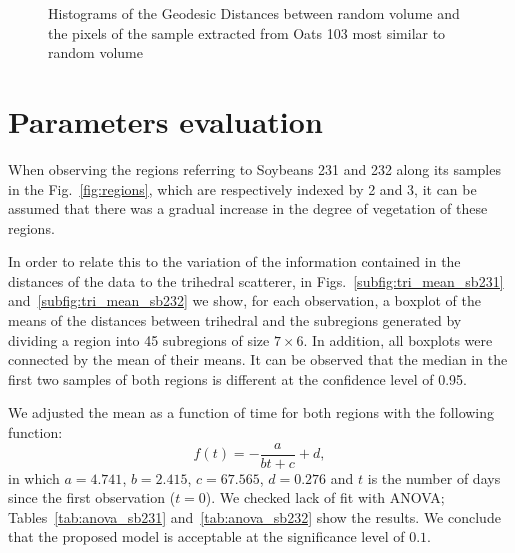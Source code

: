 \documentclass[12pt]{article}
\begin{document}
\begin{figure}[hbt]
\centering
{}
\caption{Histograms of the Geodesic Distances between random volume and the pixels of the sample extracted from Oats 103 most similar to random volume}
\label{fig:ot103_hist_rv}
\end{figure}

\section{Parameters evaluation}
When observing the regions referring to Soybeans 231 and 232 along its samples in the Fig.~\ref{fig:regions}, which are respectively indexed by 2 and 3, it can be assumed that there was a gradual increase in the degree of vegetation of these regions.

In order to relate this to the variation of the information contained in the distances of the data to the trihedral scatterer, in Figs.~\ref{subfig:tri_mean_sb231} and~\ref{subfig:tri_mean_sb232} we show, for each observation, a boxplot of the means of the distances between trihedral and the subregions generated by dividing a region into 45 subregions of size $7\times 6$.
In addition, all boxplots were connected by the mean of their means. It can be observed that the median in the first two samples of both regions is different at the confidence level of 0.95.

We adjusted the mean as a function of time for both regions with the following function:
\begin{equation}
f(t) = -\frac{a}{bt + c} + d,
\end{equation}
in which $a = 4.741$, $b = 2.415$, $c = 67.565$, $d = 0.276$ and $t$ is the number of days since the first observation ($t = 0$).
We checked lack of fit with ANOVA; Tables~\ref{tab:anova_sb231} and~\ref{tab:anova_sb232} show the results.
We conclude that the proposed model is acceptable at the significance level of $0.1$.
\end{document}
